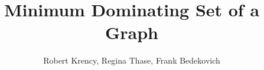 \documentclass[12pt]{article}
\title{Minimum Dominating Set of a Graph}
\author{Robert Krency, Regina Thase, Frank Bedekovich}
\begin{document}
\maketitle

\begin{multicols*}{2}
  
  
\end{multicols*}
\end{document}
